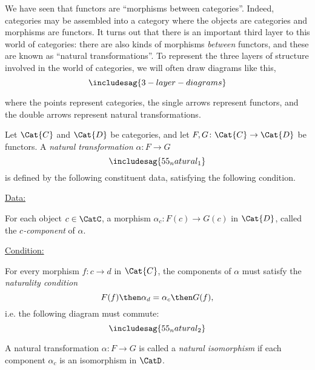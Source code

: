 
We have seen that functors are ``morphisms between categories''. Indeed, categories may be assembled into a category  where the objects are categories and morphisms are functors. It turns out that there is an important third layer to this world of categories: there are also kinds of morphisms \emph{between} functors, and these are known as ``natural transformations''. To represent the three layers of structure involved in the world of categories, we will often draw diagrams like this, 
\begin{equation}
\includesag{3-layer-diagrams}
\end{equation}


where the points represent categories, the single arrows represent functors, and the double arrows represent natural transformations. 


\begin{ctdefinition}
Let $\Cat{C}$ and $\Cat{D}$ be categories, and let $F,G\colon \Cat{C}\to \Cat{D}$ be functors. A \emph{natural transformation} $\alpha\colon F\to G$ 
\begin{equation}
\includesag{55_natural_1}
\end{equation}
is defined by the following constituent data, satisfying the following condition. 

\underline{Data:} 
\begin{compactenum}
\item For each object $c\in \CatC$, a morphism $\alpha_c\colon F(c)\to G(c)$ in $\Cat{D}$, called the $c$\emph{-component} of $\alpha$. 
\end{compactenum}
\underline{Condition:} 
\begin{compactenum}
\item For every morphism $f\colon c\to d$ in $\Cat{C}$, the components of $\alpha$ must satisfy the \emph{naturality condition}
\begin{equation}
    F(f)\then \alpha_d = \alpha_c\then G(f),
\end{equation}
i.e. the following diagram must commute:
\begin{equation}
\includesag{55_natural_2}
\end{equation}
\end{compactenum}
\end{ctdefinition}

\begin{ctdefinition}
\label{def:nat_iso}
A natural transformation $\alpha\colon F\to G$ is called a \emph{natural isomorphism} if each component $\alpha_c$ is an isomorphism in $\CatD$.
\end{ctdefinition}

